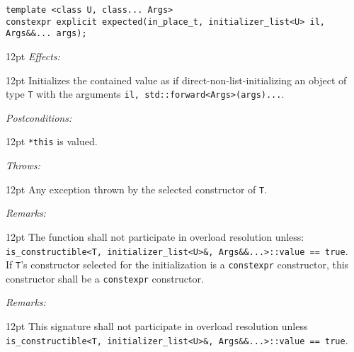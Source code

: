 \documentclass[a4paper,10pt]{article}
\newcommand{\cpp}[1]{\lstinline{#1}}
\newcommand{\wordingItem}[1]{\noindent\textit{#1:}}
\newenvironment{wordingTextItem}[1]{\wordingItem{#1}\vspace{7pt}\noindent\begin{adjustwidth}{12pt}{}}{\vspace{7pt}\end{adjustwidth}}
\newenvironment{wordingPara}{\begin{adjustwidth}{12pt}{}}{\end{adjustwidth}}
\begin{document}
\begin{lstlisting}[xleftmargin=0pt]
template <class U, class... Args>
constexpr explicit expected(in_place_t, initializer_list<U> il, Args&&... args); 
\end{lstlisting}
\begin{wordingPara}
\begin{wordingTextItem}{Effects}
Initializes the contained value as if direct-non-list-initializing an object of type \cpp{T} with the arguments \cpp{il, std::forward<Args>(args)...}.
\end{wordingTextItem}
\begin{wordingTextItem}{Postconditions}
\cpp{*this} is valued.
\end{wordingTextItem}
\begin{wordingTextItem}{Throws}
Any exception thrown by the selected constructor of \cpp{T}.
\end{wordingTextItem}
\begin{wordingTextItem}{Remarks}
The function shall not participate in overload resolution unless:\\
\noindent
\cpp{is_constructible<T, initializer_list<U>&, Args&&...>::value == true}.\\

\noindent
If \cpp{T}'s constructor selected for the initialization is a \cpp{constexpr} constructor, this constructor shall be a \cpp{constexpr} constructor.
\end{wordingTextItem}
\begin{wordingTextItem}{Remarks}
This signature shall not participate in overload resolution unless\\
\cpp{is_constructible<T, initializer_list<U>&, Args&&...>::value == true}.
\end{wordingTextItem}
\end{wordingPara}
\end{document}
